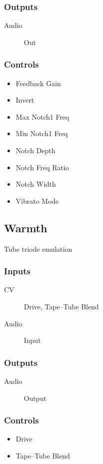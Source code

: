 \subsubsection{Outputs}
\begin{description}
\item [Audio] Out
\end{description}

\subsubsection{Controls}
\begin{itemize}
\item Feedback Gain
\item Invert
\item Max Notch1 Freq
\item Min Notch1 Freq
\item Notch Depth
\item Notch Freq Ratio
\item Notch Width
\item Vibrato Mode
\end{itemize}

\subsection{Warmth}

Tube triode emulation



\subsubsection{Inputs}
\begin{description}
\item [CV] Drive, Tape--Tube Blend
\item [Audio] Input
\end{description}

\subsubsection{Outputs}
\begin{description}
\item [Audio] Output
\end{description}

\subsubsection{Controls}
\begin{itemize}
\item Drive
\item Tape--Tube Blend
\end{itemize}


